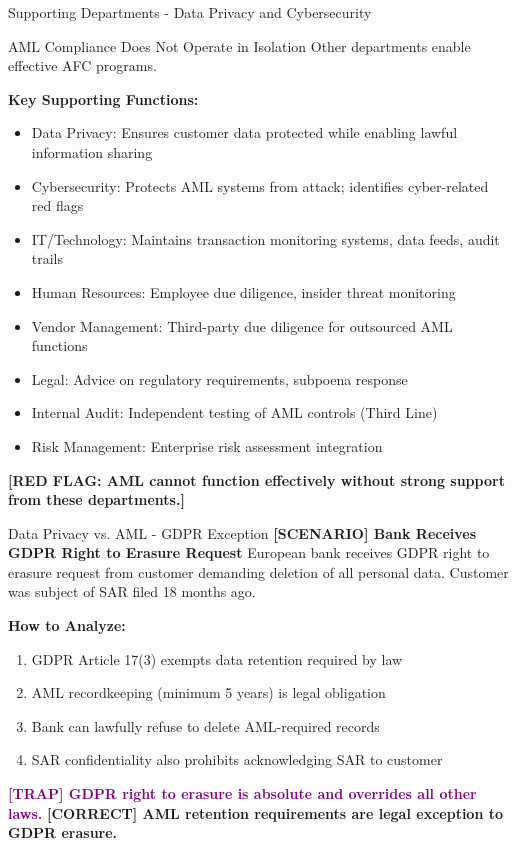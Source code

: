 \documentclass[11pt,a4paper]{beamer}
\newcommand{\trap}[1]{\textcolor{purple}{\textbf{[TRAP] #1}}}
\newcommand{\correct}[1]{\textcolor{green!50!black}{\textbf{[CORRECT] #1}}}
\newcommand{\scenario}[1]{\textcolor{blue!70!black}{\textbf{[SCENARIO] #1}}}
\newcommand{\redflag}[1]{\textcolor{red!80!black}{\textbf{[RED FLAG: #1]}}}
\begin{document}
	
	\begin{frame}{Supporting Departments - Data Privacy and Cybersecurity}
		\begin{block}{AML Compliance Does Not Operate in Isolation}
			Other departments enable effective AFC programs.
		\end{block}
		\textbf{Key Supporting Functions:}
		\begin{itemize}
			\item Data Privacy: Ensures customer data protected while enabling lawful information sharing
			\item Cybersecurity: Protects AML systems from attack; identifies cyber-related red flags
			\item IT/Technology: Maintains transaction monitoring systems, data feeds, audit trails
			\item Human Resources: Employee due diligence, insider threat monitoring
			\item Vendor Management: Third-party due diligence for outsourced AML functions
			\item Legal: Advice on regulatory requirements, subpoena response
			\item Internal Audit: Independent testing of AML controls (Third Line)
			\item Risk Management: Enterprise risk assessment integration
		\end{itemize}
		\redflag{AML cannot function effectively without strong support from these departments.}
	\end{frame}
	
	\begin{frame}{Data Privacy vs. AML - GDPR Exception}
		\scenario{Bank Receives GDPR Right to Erasure Request}
		European bank receives GDPR right to erasure request from customer demanding deletion of all personal data. Customer was subject of SAR filed 18 months ago.
		
		\vspace{0.1cm}
		\textbf{How to Analyze:}
		\begin{enumerate}
			\item GDPR Article 17(3) exempts data retention required by law
			\item AML recordkeeping (minimum 5 years) is legal obligation
			\item Bank can lawfully refuse to delete AML-required records
			\item SAR confidentiality also prohibits acknowledging SAR to customer
		\end{enumerate}
		\trap{GDPR right to erasure is absolute and overrides all other laws.}
		\correct{AML retention requirements are legal exception to GDPR erasure.}
	\end{frame}
	
\end{document}
